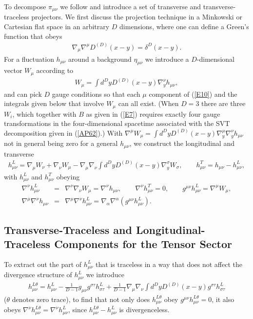 \documentclass[aps]{revtex4}
\begin{document}
To decompose $\pi_{\mu\nu}$ we follow \cite{Mannheim2005} and introduce a set of transverse and transverse-traceless projectors. We first discuss the projection technique in a Minkowski or Cartesian flat space in an arbitrary $D$ dimensions, where one can define a Green's function that obeys
%
\begin{eqnarray}
\nabla_{\mu}\nabla^{\mu}D^{(D)}(x-y)=\delta^{D}(x-y).
\label{E9}
\end{eqnarray}
%
For a fluctuation $h_{\mu\nu}$ around a background $\eta_{\mu\nu}$ we introduce a $D$-dimensional vector $W_{\mu}$ according to 
%
\begin{eqnarray}
W_{\mu}=\int d^Dy D^{(D)}(x-y)
\nabla_y^{\nu}h_{\mu\nu},
\label{E10}
\end{eqnarray}
%
and can pick $D$ gauge conditions  so that each $\mu$ component of (\ref{E10}) and the integrals given below that involve $W_{\mu}$ can all  exist. (When $D=3$ there are three $W_i$, which together with $B$ as given in (\ref{E7}) requires exactly four gauge transformations in the four-dimensional spacetime associated with the SVT decomposition given in (\ref{AP62}).) With $\nabla^{\mu}W_{\mu}=\int d^Dy D^{(D)}(x-y)\nabla_y^{\mu}\nabla_y^{\nu}h_{\mu\nu}$ not in general being zero for a general $h_{\mu\nu}$, we construct the longitudinal and transverse
%
\begin{eqnarray}
h^L_{\mu\nu}=\nabla_{\mu}W_{\nu}+\nabla_{\nu}W_{\mu}-\nabla_{\mu}\nabla_{\nu}\int d^Dy D^{(D)}(x-y)\nabla_y^{\sigma}W_{\sigma},\qquad h^T_{\mu\nu}=h_{\mu\nu}-h^L_{\mu\nu},
\label{E11}
\end{eqnarray}
%
with $h^{L}_{\mu\nu}$ and $h^{T}_{\mu\nu}$  obeying 
%
\begin{eqnarray}
\nabla^{\nu}h^L_{\mu\nu}&=&\nabla^{\nu}\nabla_{\nu}W_{\mu}=\nabla^{\nu}h_{\mu\nu}, \qquad \nabla^{\nu}h^T_{\mu\nu}=0,\qquad g^{\mu\nu}h^{L}_{\mu\nu}=\nabla^{\mu}W_{\mu},
\nonumber\\
\nabla^{\mu}\nabla^{\nu}h_{\mu\nu}&=&\nabla^{\mu}\nabla^{\nu}h^{L}_{\mu\nu} =\nabla_{\alpha}\nabla^{\alpha}(g^{\mu\nu}h^{L}_{\mu\nu}).
\label{E12}
\end{eqnarray}
%

\subsection{Transverse-Traceless  and Longitudinal-Traceless Components for the Tensor Sector}

To extract out the part of $h^L_{\mu\nu}$ that is traceless in a way that does not affect the divergence structure of  $h^L_{\mu\nu}$ we introduce
%
\begin{eqnarray}
h^{L\theta}_{\mu\nu}= h^{L}_{\mu\nu}-\frac{1}{D-1}g_{\mu\nu}g^{\sigma\tau}h^{L}_{\sigma\tau}
+\frac{1}{D-1}\nabla_{\mu}\nabla_{\nu}\int d^Dy D^{(D)}(x-y)g^{\sigma\tau}h^{L}_{\sigma\tau}
\label{E13}
\end{eqnarray}
%
($\theta$ denotes zero trace), to find that not only does $h^{L\theta}_{\mu\nu}$ obey $g^{\mu\nu}h^{L\theta}_{\mu\nu}=0$,  it also obeys $\nabla^{\nu}h^{L\theta}_{\mu\nu}=\nabla^{\nu}h^{L}_{\mu\nu}$, since $h^{L\theta}_{\mu\nu}- h^{L}_{\mu\nu}$ is divergenceless.
\end{document}
